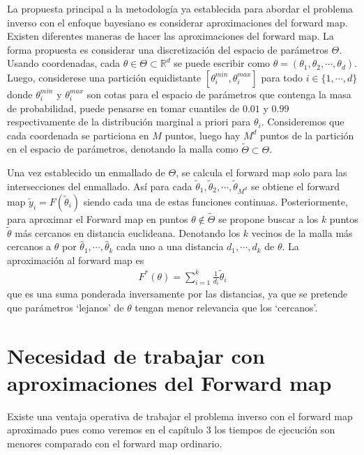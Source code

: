 La propuesta principal a la metodología ya establecida para abordar el problema inverso con el enfoque bayesiano es considerar aproximaciones del forward map. Existen diferentes maneras de hacer las aproximaciones del forward map. La forma propuesta es considerar una discretización del espacio de parámetros $\Theta$. Usando coordenadas, cada $\theta \in \Theta \subset \mathbb{R}^d$ se puede escribir como $\theta = (\theta_1, \theta_2, \cdots, \theta_d)$. Luego, considerese una partición equidistante $[\theta_i^{min},\theta_i^{max}]$ para todo $i \in \{1,\cdots,d\}$ donde $\theta_i^{min}$ y $\theta_i^{max}$ son cotas para el espacio de parámetros que contenga la masa de probabilidad, puede pensarse en tomar cuantiles de $0.01$ y $0.99$ respectivamente de la distribución marginal a priori para $\theta_i$. Consideremos que cada coordenada se particiona en $M$ puntos, luego hay $M^d$ puntos de la partición en el espacio de parámetros, denotando la malla como $\tilde{\Theta}\subset \Theta$.

Una vez establecido un enmallado de $\Theta$, se calcula el forward map solo para las intersecciones del enmallado. Así para cada $\tilde{\theta}_1, \tilde{\theta}_2, \cdots, \tilde{\theta}_{M^d}$ se obtiene el forward map $\tilde{y}_i = F(\tilde{\theta}_i)$ siendo cada una de estas funciones continuas. Posteriormente, para aproximar el Forward map en puntos $\theta \not\in \tilde{\Theta}$ se propone buscar a los $k$ puntos $\tilde{\theta}$ más cercanos en distancia euclideana. Denotando los $k$ vecinos de la malla más cercanos a $\theta$ por $\hat{\theta}_1, \cdots, \hat{\theta}_k$ cada uno a una distancia $d_1, \cdots, d_k$ de $\theta$. La aproximación al forward map es
\begin{align}
    F^{*}(\theta) = \sum_{i = 1}^{k} \frac{1}{d_i} \tilde{\theta}_i
\end{align}
que es una suma ponderada inversamente por las distancias, ya que se pretende que parámetros `lejanos' de $\theta$ tengan menor relevancia que los `cercanos'. 



\section{Necesidad de trabajar con aproximaciones del Forward map}

Existe una ventaja operativa de trabajar el problema inverso con el forward map aproximado pues como veremos en el capítulo 3 los tiempos de ejecución son menores comparado con el forward map ordinario. 

